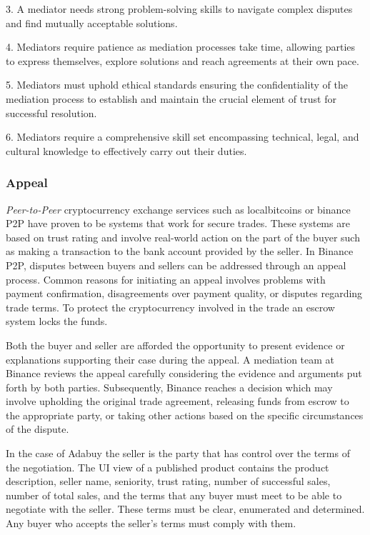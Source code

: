 \documentclass[12pt]{article}
\begin{document}
3. A mediator needs strong problem-solving skills to navigate complex disputes and find mutually acceptable solutions. 

4. Mediators require patience as mediation processes take time, allowing parties to express themselves, explore solutions and reach agreements at their own pace.

5. Mediators must uphold ethical standards ensuring the confidentiality of the mediation process to establish and maintain the crucial element of trust for successful resolution.

6. Mediators require a comprehensive skill set encompassing technical, legal, and cultural knowledge to effectively carry out their duties.

\subsubsection { Appeal } 

\emph{Peer-to-Peer} cryptocurrency exchange services such as localbitcoins or binance P2P have proven to be systems that work for secure trades. These systems are based on trust rating and involve real-world action on the part of the buyer such as making a transaction to the bank account provided by the seller. In Binance P2P, disputes between buyers and sellers can be addressed through an appeal process. Common reasons for initiating an appeal involves problems with payment confirmation, disagreements over payment quality, or disputes regarding trade terms. To protect the cryptocurrency involved in the trade an escrow system locks the funds.

Both the buyer and seller are afforded the opportunity to present evidence or explanations supporting their case during the appeal. A mediation team at Binance reviews the appeal carefully considering the evidence and arguments put forth by both parties. Subsequently, Binance reaches a decision which may involve upholding the original trade agreement, releasing funds from escrow to the appropriate party, or taking other actions based on the specific circumstances of the dispute.

In the case of Adabuy the seller is the party that has control over the terms of the negotiation. The UI view of a published product contains the product description, seller name, seniority, trust rating, number of successful sales, number of total sales, and the terms that any buyer must meet to be able to negotiate with the seller. These terms must be clear, enumerated and determined. Any buyer who accepts the seller's terms must comply with them.
\end{document}
